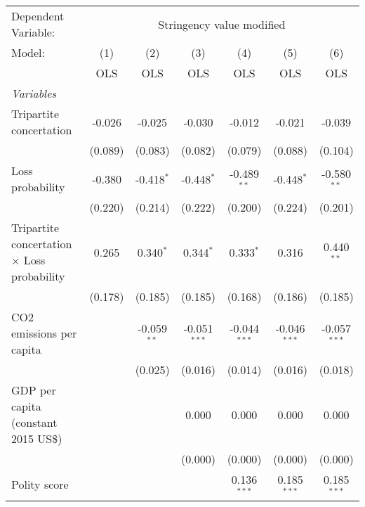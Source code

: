 
\begingroup
\centering
\begin{tabular}{lcccccc}
   \toprule
   Dependent Variable: & \multicolumn{6}{c}{Stringency value modified}\\
   Model:                                             & (1)     & (2)           & (3)            & (4)            & (5)            & (6)\\  
                                                      &  OLS    & OLS           & OLS            & OLS            & OLS            & OLS\\  
   \midrule
   \emph{Variables}\\
   Tripartite concertation                            & -0.026  & -0.025        & -0.030         & -0.012         & -0.021         & -0.039\\   
                                                      & (0.089) & (0.083)       & (0.082)        & (0.079)        & (0.088)        & (0.104)\\   
   Loss probability                                   & -0.380  & -0.418$^{*}$  & -0.448$^{*}$   & -0.489$^{**}$  & -0.448$^{*}$   & -0.580$^{**}$\\   
                                                      & (0.220) & (0.214)       & (0.222)        & (0.200)        & (0.224)        & (0.201)\\   
   Tripartite concertation $\times$ Loss probability  & 0.265   & 0.340$^{*}$   & 0.344$^{*}$    & 0.333$^{*}$    & 0.316          & 0.440$^{**}$\\   
                                                      & (0.178) & (0.185)       & (0.185)        & (0.168)        & (0.186)        & (0.185)\\   
   CO2 emissions per capita                           &         & -0.059$^{**}$ & -0.051$^{***}$ & -0.044$^{***}$ & -0.046$^{***}$ & -0.057$^{***}$\\   
                                                      &         & (0.025)       & (0.016)        & (0.014)        & (0.016)        & (0.018)\\   
   GDP per capita (constant 2015 US\$)                &         &               & 0.000          & 0.000          & 0.000          & 0.000\\   
                                                      &         &               & (0.000)        & (0.000)        & (0.000)        & (0.000)\\   
   Polity score                                       &         &               &                & 0.136$^{***}$  & 0.185$^{***}$  & 0.185$^{***}$\\   

\end{tabular}
